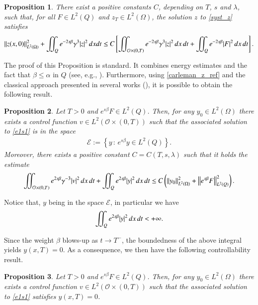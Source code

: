 \documentclass[preprint,1p]{elsarticle}
\newcommand{\norm}[2]{\left\|#1\right\|_{#2}}
\newcommand{\intd}{\displaystyle\int \kern -7pt \int}
\newtheorem{proposition}{\bf Proposition}[section]
\begin{document}
\begin{proposition}
There exist a positive constants $C$, depending on $T$, $s$ and $\lambda$, such that, for all $F\in L^2(Q)$ and $z_T\in L^2(\Omega)$, the solution $z$ to \eqref{syst_z} satisfies 
\begin{align}\label{carleman_z_ref}
	\norm{z(x,0)}{L^2(\Omega)}^2 + \intd_Q e^{-2s\beta}\gamma^3|z|^2\,dxdt \leq C \left[\intd_{\mathcal O\times(0,T)} e^{-2s\beta}\gamma^3 |z|^2\,dx\,dt + \intd_Q e^{-2s\beta}|F|^2\,dx\,dt\right].
\end{align}
\end{proposition}

The proof of this Proposition is standard. It combines energy estimates and the fact that $\beta\leq\alpha$ in $Q$ (see, e.g., \cite{fernandez2004local}). Furthermore, using \eqref{carleman_z_ref} and the classical approach presented in several works (\cite{fernandez2004local,fursikov1996controllability,gueye2013insensitizing,tao2016null}), it is possible to obtain the following result.

\begin{proposition}\label{control_prop_F}
Let $T>0$ and $e^{s\beta}F\in L^2(Q)$. Then, for any $y_0\in L^2(\Omega)$ there exists a control function $v\in L^2(\mathcal O\times(0,T))$ such that the associated solution to \eqref{e1s1} is in the space
\begin{align*}
	\mathcal E:=\left\{y\,:\,e^{s\beta}y\in L^2(Q)\right\}.
\end{align*}
Moreover, there exists a positive constant $C=C(T,s,\lambda)$ such that it holds the estimate
\begin{align}\label{energy_weight}
	\intd_{\mathcal O\times(0,T)} e^{2s\beta}\gamma^{-3} |v|^2\,dx\,dt + \intd_Q e^{2s\beta}|y|^2\,dx\,dt 
	 \leq C \left(\norm{y_0}{L^2(\Omega)}^2 + \norm{e^{s\beta}F}{L^2(Q)}^2\right).
\end{align}
\end{proposition} 
Notice that, $y$ being in the space $\mathcal E$, in particular we have 
\begin{align*}
	\intd_Q e^{2s\beta}|y|^2\,dx\,dt < +\infty.
\end{align*}

Since the weight $\beta$ blows-up as $t\to T^-$, the boundedness of the above integral yields $y(x,T)=0$. As a consequence, we then have the following controllability result.
\begin{proposition}
Let $T>0$ and $e^{s\beta}F\in L^2(Q)$. Then, for any $y_0\in L^2(\Omega)$ there exists a control function $v\in L^2(\mathcal O\times(0,T))$ such that the associated solution to \eqref{e1s1} satisfies $y(x,T)=0$.
\end{proposition} 
 
\end{document}
